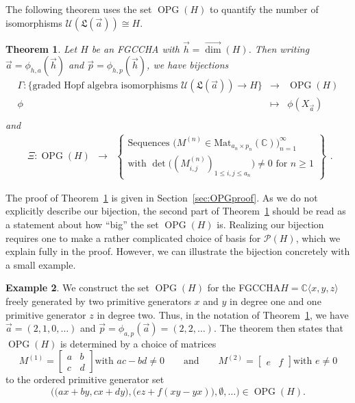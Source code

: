 \documentclass[11pt]{amsart}
\newtheorem{theorem}{Theorem}[section]
\theoremstyle{definition}
\newtheorem{example}[theorem]{Example}
\numberwithin{equation}{section}
\def\CC{{\mathbb C}}
\newcommand{\FGCCHA}{\textsf{FGCCHA}\xspace}
\newcommand{\vecdim}{\overrightarrow{\dim}}
\newcommand{\OPG}{\operatorname{OPG}}
\newcommand{\lucas}[1]{\todo[size=\tiny,color=red!50]{#1 \\ \hfill --- Lucas}}
\begin{document}
The following theorem uses the set $\OPG(H)$ to quantify the number of isomorphisms  $\mathcal{U}(\mathfrak{L}(\vec{a})) \cong H$.

\begin{theorem}
\label{thm:OPGmaps}
Let $H$ be an \FGCCHA with $\vec{h} = \vecdim(H)$.  Then writing $\vec{a} = \phi_{h, a}(\vec{h})$ and $\vec{p} = \phi_{h, p}(\vec{h})$, we have bijections
\[
\begin{array}{rcl}
\Gamma: \{\text{graded Hopf algebra isomorphisms $\mathcal{U}(\mathfrak{L}(\vec{a})) \to H$}\} & \to & \OPG(H) \\
\phi & \mapsto & \phi(X_{\vec{a}}) \\
\end{array}
\]
and %
\[
\begin{array}{rcl}
\Xi: \OPG(H) &\to& \left\{ \begin{array}{c}
\text{Sequences $\big(M^{(n)} \in \mathrm{Mat}_{a_{n} \times p_{n}}(\CC)\big)_{n=1}^{\infty}$ } \\
\text{with $\det\big( (M^{(n)}_{i, j})_{1 \le i, j \le a_{n}} \big) \neq 0$ for $n \ge 1$}
\end{array}\right\}
\end{array}.
\]
\end{theorem}

The proof of Theorem~\ref{thm:OPGmaps} is given in Section~\ref{sec:OPGproof}.  
As we do not explicitly describe our bijection, the second part of Theorem~\ref{thm:OPGmaps} should be read as a statement about how ``big'' the set $\OPG(H)$ is.  
Realizing our bijection requires one to make a rather complicated choice of basis for $\mathcal{P}(H)$, which we explain fully in the proof.  
However, we can illustrate the bijection concretely with a small example.  

\begin{example}
\label{ex:OPG}
We construct the set $\OPG(H)$ for the \FGCCHA $H = \CC\langle x, y, z\rangle$ freely generated by two primitive generators $x$ and $y$ in degree one and one primitive generator $z$ in degree two.  
Thus, in the notation of Theorem~\ref{thm:OPGmaps}, we have $\vec{a} = (2, 1, 0, \ldots)$ and $\vec{p} = \phi_{a, p}(\vec{a}) = (2, 2, \ldots)$. 
The theorem then states that $\OPG(H)$ is determined by a choice of matrices
\[
M^{(1)} = \begin{bmatrix}
a & b \\
c & d
\end{bmatrix}
\text{with $ac-bd \neq 0$}
\qquad\text{and}\qquad
M^{(2)} = \begin{bmatrix}
e & f
\end{bmatrix}
\text{with $e \neq 0$}
\]
to the ordered primitive generator set
\[
\Big(\big(ax+by, cx+dy\big), \big(ez + f(xy-yx)\big), \emptyset, \ldots \Big) \in \OPG(H).
\]
\end{example}
\end{document}
